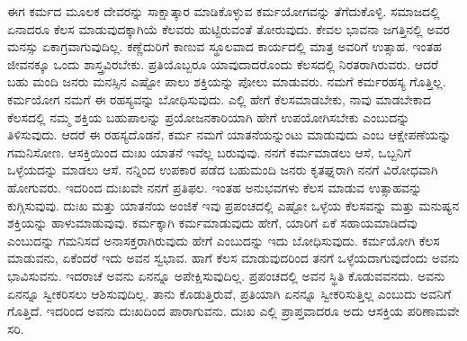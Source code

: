 ಈಗ ಕರ್ಮದ ಮೂಲಕ ದೇವರನ್ನು ಸಾಕ್ಷಾತ್ಕಾರ ಮಾಡಿಕೊಳ್ಳುವ ಕರ್ಮಯೋಗವನ್ನು ತೆಗೆದುಕೊಳ್ಳಿ. ಸಮಾಜದಲ್ಲಿ ಏನಾದರೂ ಕೆಲಸ ಮಾಡುವುದಕ್ಕಾಗಿಯೆ ಕೆಲವರು ಹುಟ್ಟಿರುವಂತೆ ತೋರುವುದು. ಕೇವಲ ಭಾವನಾ ಜಗತ್ತಿನಲ್ಲಿ ಅವರ ಮನಸ್ಸು ಏಕಾಗ್ರವಾಗುವುದಿಲ್ಲ. ಕಣ್ಣೆದುರಿಗೆ ಕಾಣುವ ಸ್ಥೂಲವಾದ ಕಾರ್ಯದಲ್ಲಿ ಮಾತ್ರ ಅವರಿಗೆ ಉತ್ಸಾಹ. ಇಂತಹ ಜೀವನಕ್ಕೂ ಒಂದು ಶಾಸ್ತ್ರವಿರಬೇಕು. ಪ್ರತಿಯೊಬ್ಬರೂ ಯಾವುದಾದರೊಂದು ಕೆಲಸದಲ್ಲಿ ನಿರತರಾಗಿರುವರು. ಆದರೆ ಬಹು ಮಂದಿ ಜನರು ಮನಸ್ಸಿನ ಎಷ್ಟೋ ಪಾಲು ಶಕ್ತಿಯನ್ನು ಪೋಲು ಮಾಡುವರು. ನಮಗೆ ಕರ್ಮರಹಸ್ಯ ಗೊತ್ತಿಲ್ಲ. ಕರ್ಮಯೋಗ ನಮಗೆ ಈ ರಹಸ್ಯವನ್ನು ಬೋಧಿಸುವುದು. ಎಲ್ಲಿ ಹೇಗೆ ಕೆಲಸಮಾಡಬೇಕು, ನಾವು ಮಾಡಬೇಕಾದ ಕೆಲಸದಲ್ಲಿ ನಮ್ಮ ಶಕ್ತಿಯ ಬಹುಪಾಲನ್ನು ಪ್ರಯೋಜನಕಾರಿಯಾಗಿ ಹೇಗೆ ಉಪಯೋಗಿಸಬೇಕು ಎಂಬುದನ್ನು ತಿಳಿಸುವುದು. ಆದರೆ ಈ ರಹಸ್ಯದೊಡನೆ, ಕರ್ಮ ನಮಗೆ ಯಾತನೆಯನ್ನುಂಟು ಮಾಡುವುದು ಎಂಬ ಆಕ್ಷೇಪಣೆಯನ್ನು ಗಮನಿಸೋಣ. ಆಸಕ್ತಿಯಿಂದ ದುಃಖ ಯಾತನೆ ಇವೆಲ್ಲ ಬರುವುವು. ನನಗೆ ಕರ್ಮಮಾಡಲು ಆಸೆ, ಒಬ್ಬನಿಗೆ ಒಳ್ಳೆಯದನ್ನು ಮಾಡಲು ಆಸೆ. ನನ್ನಿಂದ ಉಪಕಾರ ಪಡೆದ ಬಹುಮಂದಿ ಜನರು ಕೃತಘ್ನರಾಗಿ ನನಗೆ ವಿರೋಧವಾಗಿ ಹೋಗುವರು. ಇದರಿಂದ ದುಃಖವೇ ನನಗೆ ಪ್ರತಿಫಲ. ಇಂತಹ ಅನುಭವಗಳು ಕೆಲಸ ಮಾಡುವ ಉತ್ಸಾಹವನ್ನು ಕುಗ್ಗಿಸುವುವು. ದುಃಖ ಮತ್ತು ಯಾತನೆಯ ಅಂಜಿಕೆ ಇವು ಪ್ರಪಂಚದಲ್ಲಿ ಎಷ್ಟೋ ಒಳ್ಳೆಯ ಕೆಲಸವನ್ನು ಮತ್ತು ಮನುಷ್ಯನ ಶಕ್ತಿಯನ್ನು ಹಾಳುಮಾಡುವುವು. ಕರ್ಮಕ್ಕಾಗಿ ಕರ್ಮಮಾಡುವುದು ಹೇಗೆ, ಯಾರಿಗೆ ಏಕೆ ಸಹಾಯಮಾಡಿದೆವು ಎಂಬುದನ್ನು ಗಮನಿಸದೆ ಅನಾಸಕ್ತರಾಗಿರುವುದು ಹೇಗೆ ಎಂಬುದನ್ನು ಇದು ಬೋಧಿಸುವುದು. ಕರ್ಮಯೋಗಿ ಕೆಲಸ ಮಾಡುವನು, ಏಕೆಂದರೆ ಇದು ಅವನ ಸ್ವಭಾವ. ಹಾಗೆ ಕೆಲಸ ಮಾಡುವುದರಿಂದ ತನಗೆ ಒಳ್ಳೆಯದಾಗುವುದೆಂದು ಅವನು ಭಾವಿಸುವನು. ಇದರಾಚೆ ಅವನು ಏನನ್ನೂ ಅಪೇಕ್ಷಿಸುವುದಿಲ್ಲ. ಪ್ರಪಂಚದಲ್ಲಿ ಅವನ ಸ್ಥಿತಿ ಕೊಡುವವನದು. ಅವನು ಏನನ್ನೂ ಸ್ವೀಕರಿಸಲು ಆಶಿಸುವುದಿಲ್ಲ. ತಾನು ಕೊಡುತ್ತಿರುವೆ, ಪ್ರತಿಯಾಗಿ ಏನನ್ನೂ ಸ್ವೀಕರಿಸುತ್ತಿಲ್ಲ ಎಂಬುದು ಅವನಿಗೆ ಗೊತ್ತಿದೆ. ಇದರಿಂದ ಅವನು ದುಃಖದಿಂದ ಪಾರಾಗುವನು. ದುಃಖ ಎಲ್ಲಿ ಪ್ರಾಪ್ತವಾದರೂ ಅದು ಆಸಕ್ತಿಯ ಪರಿಣಾಮವೇ ಸರಿ.

